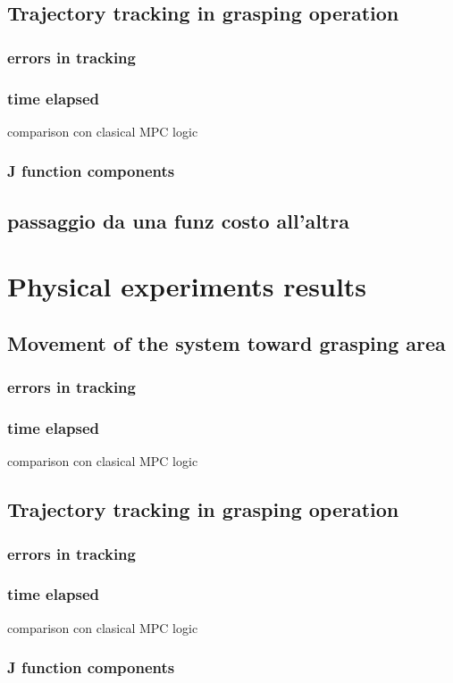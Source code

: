 	\subsection{Trajectory tracking in grasping operation}

		\subsubsection{errors in tracking}
			
		\subsubsection{time elapsed}
			comparison con clasical MPC logic
		\subsubsection{J function components}
		
		\subsection{passaggio da una funz costo all'altra}
	
\section{Physical experiments results}
	
	\subsection{Movement of the system toward grasping area}

		\subsubsection{errors in tracking}
			
		\subsubsection{time elapsed}
			comparison con clasical MPC logic

	\subsection{Trajectory tracking in grasping operation}

		\subsubsection{errors in tracking}
			
		\subsubsection{time elapsed}
			comparison con clasical MPC logic
		\subsubsection{J function components}
